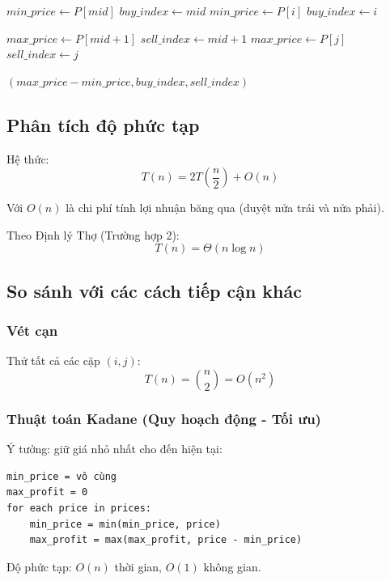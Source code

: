 \documentclass{article}
\begin{document}
\begin{algorithmic}[1]
    \State $min\_price \gets P[mid]$
    \State $buy\_index \gets mid$
            \State $min\_price \gets P[i]$
            \State $buy\_index \gets i$
        \EndIf
    \EndFor
    
    \State $max\_price \gets P[mid+1]$
    \State $sell\_index \gets mid+1$
            \State $max\_price \gets P[j]$
            \State $sell\_index \gets j$
        \EndIf
    \EndFor
    
    \State \Return $(max\_price - min\_price, buy\_index, sell\_index)$
\EndFunction
\end{algorithmic}

\subsection{Phân tích độ phức tạp}

Hệ thức:
\[
T(n) = 2T\left(\frac{n}{2}\right) + O(n)
\]

Với \(O(n)\) là chi phí tính lợi nhuận băng qua (duyệt nửa trái và nửa phải).

Theo Định lý Thợ (Trường hợp 2):
\[
T(n) = \Theta(n \log n)
\]

\subsection{So sánh với các cách tiếp cận khác}

\subsubsection{Vét cạn}
Thử tất cả các cặp \((i, j)\):
\[
T(n) = \binom{n}{2} = O(n^2)
\]

\subsubsection{Thuật toán Kadane (Quy hoạch động - Tối ưu)}
Ý tưởng: giữ giá nhỏ nhất cho đến hiện tại:
\begin{verbatim}
min_price = vô cùng
max_profit = 0
for each price in prices:
    min_price = min(min_price, price)
    max_profit = max(max_profit, price - min_price)
\end{verbatim}
Độ phức tạp: \(O(n)\) thời gian, \(O(1)\) không gian.
\end{document}
